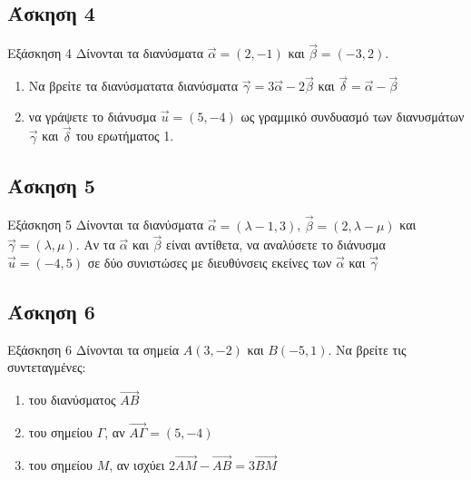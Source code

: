 \documentclass[greek]{beamer}
\begin{document}
\subsection{Άσκηση 4}
\begin{frame}[label=Άσκηση4,t]{Εξάσκηση 4}
      Δίνονται τα διανύσματα $\vec{α}=(2,-1)$ και $\vec{β}=(-3,2)$.
      \begin{enumerate}
            \item<1-> Να βρείτε τα διανύσματατα διανύσματα $\vec{γ}=3\vec{α}-2\vec{β}$ και $\vec{δ}=\vec{α}-\vec{β}$
            \item<2-> να γράψετε το διάνυσμα $\vec{u}=(5,-4)$ ως γραμμικό συνδυασμό των διανυσμάτων $\vec{γ}$ και $\vec{δ}$ του ερωτήματος 1.
      \end{enumerate}
\end{frame}

\subsection{Άσκηση 5}
\begin{frame}[label=Άσκηση5,t]{Εξάσκηση 5}
      Δίνονται τα διανύσματα $\vec{α}=(λ-1,3)$, $\vec{β}=(2,λ-μ)$ και $\vec{γ}=(λ,μ)$. Αν τα $\vec{α}$ και $\vec{β}$ είναι αντίθετα, να αναλύσετε το διάνυσμα $\vec{u}=(-4,5)$ σε δύο συνιστώσες με διευθύνσεις εκείνες των $\vec{α}$ και $\vec{γ}$

\end{frame}

\subsection{Άσκηση 6}
\begin{frame}[label=Άσκηση6,t]{Εξάσκηση 6}
      Δίνονται τα σημεία $Α(3,-2)$ και $Β(-5,1)$. Να βρείτε τις συντεταγμένες:

      \begin{enumerate}
            \item<1-> του διανύσματος $\overrightarrow{ΑΒ}$
            \item<2-> του σημείου $Γ$, αν $\overrightarrow{ΑΓ}=(5,-4)$
            \item<3-> του σημείου $Μ$, αν ισχύει $2\overrightarrow{ΑΜ}-\overrightarrow{ΑΒ}=3\overrightarrow{ΒΜ}$
      \end{enumerate}

\end{frame}
\end{document}
